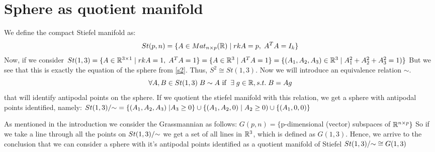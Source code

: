 \documentclass[11pt,a4paper]{report}
\begin{document}
\section{ Sphere as quotient manifold} 
We define the compact Stiefel manifold as:
$$ St(p,n) = \{ A \in Mat_{n \times p}(\mathbb{R}) \; | \; rkA = p, \; A^T A = I_k \}  $$
Now, if we consider $St(1,3) = \{ A \in \mathbb{R}^{3 \times 1} \; | \; rkA=1, \; A^T A = 1 \} = \{ A \in \mathbb{R}^3 \; | \; A^T A = 1 \} = 
\{ (A_1, A_2, A_3) \in \mathbb{R}^3 \; | \; A_1^2 + A_2^2 + A_3^2 = 1) \} $ 
But we see that this is exactly the equation of the sphere from \ref{s2}. Thus, $S^2 \cong St(1,3)$.
Now we will introduce an equivalence relation $ \sim $.
$$ \forall A,B \in St(1,3) \; B \sim A \text{ if } \; \exists \; g \in \mathbb{R}, s.t. \; B = A g $$
that will identify antipodal points on the sphere.
If we quotient the stiefel manifold with this relation, we get a sphere with antipodal points identified, namely: 
$ St(1,3)/{\sim} = \{ (A_1, A_2, A_3) \; | A_3 \geq 0 \} \cup \{ (A_1, A_2, 0) \; | \; A_2 \geq 0) \cup \{ (A_1, 0, 0) \}  $

As mentioned in the introduction we consider the Grassmannian as follows:
$G(p,n) = \{ $p-dimensional (vector) subspaces of $\mathbb{R}^{n \times p} \}$
So if we take a line through all the points on $St(1,3)/{\sim}$ we get a set of all lines in $\mathbb{R}^3$, which is defined as $G(1,3)$. 
Hence, we arrive to the conclusion that we can consider a sphere with it's antipodal points identified as a quotient manifold of Stiefel $St(1,3)/{\sim} \cong G(1,3)$
\end{document}
